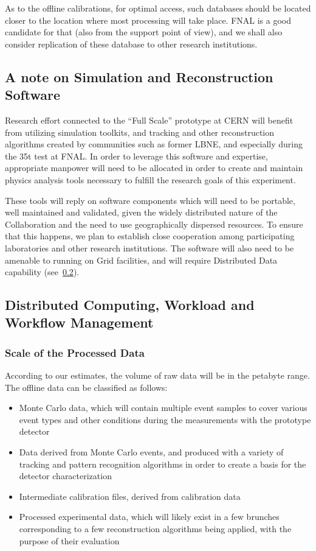 As to the offline calibrations, for optimal access, such databases should be located closer to the location where most processing will take place.
FNAL is a good candidate for that (also from the support point of view), and we shall also consider replication of these database to other
research institutions.

\subsection{A note on Simulation and Reconstruction Software}
Research effort connected to the ``Full Scale'' prototype at CERN will benefit from utilizing simulation toolkits, and tracking and other reconstruction
algorithms created by communities such as former LBNE, and especially during the 35t test at FNAL. In order to leverage this
software and expertise, appropriate manpower will need to be allocated in order to create and maintain physics analysis tools
necessary to fulfill the research goals of this experiment.

These tools will reply on software components which will need to be portable, well maintained and validated, given
the widely distributed nature of the Collaboration and the need to use geographically dispersed resources. To ensure that this happens,
we plan to establish close cooperation among participating laboratories and other research institutions. The software will also need
to be amenable to running on Grid facilities, and will require Distributed Data capability (see~\ref{wms}).

\subsection{Distributed Computing, Workload and Workflow Management}
\label{wms}
\subsubsection{Scale of the Processed Data}
According to our estimates, the volume of raw data will be in the petabyte range. The offline data can be classified as follows:
\begin{itemize}
\item Monte Carlo data, which will contain multiple event samples to cover various event types and other conditions during the measurements with the prototype detector
\item Data derived from Monte Carlo events, and produced with a variety of tracking and pattern recognition algorithms in order to create a basis for the detector characterization
\item Intermediate calibration files, derived from calibration data
\item Processed experimental data, which will likely exist in a few brunches corresponding to a few reconstruction algorithms being applied, with the purpose of their evaluation
\end{itemize}

